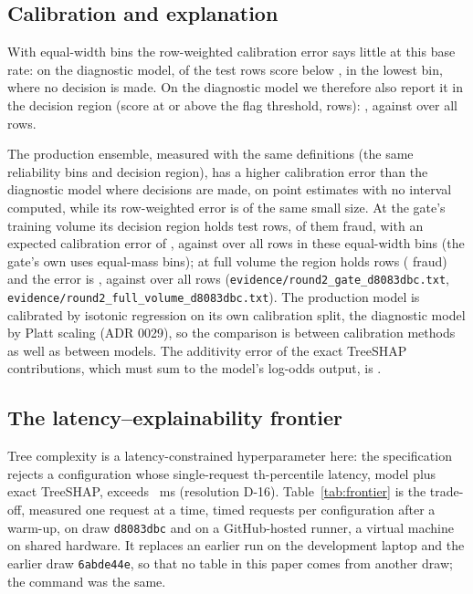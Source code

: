 \subsection{Calibration and explanation}

With equal-width bins the row-weighted calibration error says little at this base rate: on the
diagnostic model, \nBatLowBinRows{} of the \nBatTestRows{} test rows score below
\nBatLowBinTop{}, in the lowest bin, where no decision is made. On the diagnostic model we therefore also
report it in the decision region (score at or above the flag threshold, \nBatDecisionRows{} rows):
\nBatECEDecision{}, against \nBatECEAll{} over all rows.

The production ensemble, measured with the same definitions (the same reliability bins and decision
region), has a higher calibration error than the diagnostic model where decisions are made, on
point estimates with no interval computed, while its row-weighted error is of the same small size. At the gate's training volume its decision region holds
\nGateCalRegionRows{} test rows, \nGateCalRegionFraud{} of them fraud, with an expected calibration
error of \nGateCalRegionECE{}, against \nGateCalECEAll{} over all rows in these equal-width bins (the
gate's own \nGateECE{} uses \nEceBins{} equal-mass bins); at full volume the region holds
\nFvCalRegionRows{} rows (\nFvCalRegionFraud{} fraud) and the error is \nFvCalRegionECE{}, against
\nFvCalECEAll{} over all rows (\texttt{evidence/round2\_gate\_d8083dbc.txt},
\texttt{evidence/round2\_full\_volume\_d8083dbc.txt}). The production model is calibrated by isotonic
regression on its own calibration split, the diagnostic model by Platt scaling (ADR 0029), so the
comparison is between calibration methods as well as between models. The additivity error of the exact TreeSHAP
contributions, which must sum to the model's log-odds output, is \nBatAdditivity{}.

\subsection{The latency--explainability frontier}
\label{sec:frontier}

Tree complexity is a latency-constrained hyperparameter here: the specification rejects a configuration whose
single-request \nPctlTail{}th-percentile latency, model plus exact TreeSHAP, exceeds \nLatencyPNineNineShap{}~ms
(resolution D-16). Table~\ref{tab:frontier} is the trade-off, measured one request at a time,
\nFrRequests{} timed requests per configuration after a warm-up, on draw \texttt{d8083dbc} and on a
GitHub-hosted runner, a virtual machine on shared hardware. It replaces an earlier run on the development
laptop and the earlier draw \texttt{6abde44e}, so that no table in this paper comes from another
draw; the command was the same.

